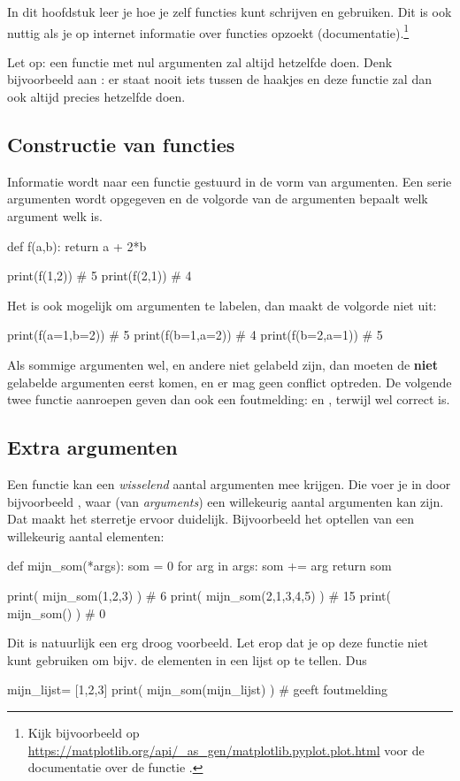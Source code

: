 \documentclass[a4paper,11pt, fleqn]{article}
\begin{document}
In dit hoofdstuk leer je hoe je zelf functies kunt schrijven en gebruiken. Dit is ook nuttig als je op internet informatie over functies opzoekt (documentatie).\footnote{Kijk bijvoorbeeld op \url{https://matplotlib.org/api/_as_gen/matplotlib.pyplot.plot.html} voor de documentatie over de functie .}

Let op: een functie met nul argumenten zal altijd hetzelfde doen. Denk bijvoorbeeld aan : er staat nooit iets tussen de haakjes en deze functie zal dan ook altijd precies hetzelfde doen.

\subsection{Constructie van functies}
Informatie wordt naar een functie gestuurd in de vorm van argumenten. Een serie argumenten wordt opgegeven en de volgorde van de argumenten bepaalt welk argument welk is.
\begin{python}
def f(a,b):
    return a + 2*b
    
print(f(1,2)) # 5
print(f(2,1)) # 4
\end{python}

Het is ook mogelijk om argumenten te labelen, dan maakt de volgorde niet uit:
\begin{python}  
print(f(a=1,b=2)) # 5
print(f(b=1,a=2)) # 4
print(f(b=2,a=1)) # 5
\end{python}
Als sommige argumenten wel, en andere niet gelabeld zijn, dan moeten de {\bf niet} gelabelde argumenten eerst komen, en er mag geen conflict optreden. De volgende twee functie aanroepen geven dan ook een foutmelding:  en , terwijl  wel correct is.

\subsection{Extra argumenten}
Een functie kan een {\it wisselend} aantal argumenten mee krijgen. Die voer je in door bijvoorbeeld , waar  (van {\it arguments}) een willekeurig aantal argumenten kan zijn. Dat maakt het sterretje ervoor duidelijk.
Bijvoorbeeld het optellen van een willekeurig aantal elementen:
\begin{python}
def mijn_som(*args):
    som = 0
    for arg in args:
        som += arg
    return som

print( mijn_som(1,2,3) )     #  6    
print( mijn_som(2,1,3,4,5) ) # 15
print( mijn_som() )          #  0    
\end{python}
Dit is natuurlijk een erg droog voorbeeld. Let erop dat je op deze functie niet kunt gebruiken om bijv. de elementen in een lijst op te tellen. Dus 
\begin{python}
mijn_lijst= [1,2,3]
print( mijn_som(mijn_lijst) )     # geeft foutmelding
\end{python}
\end{document}
